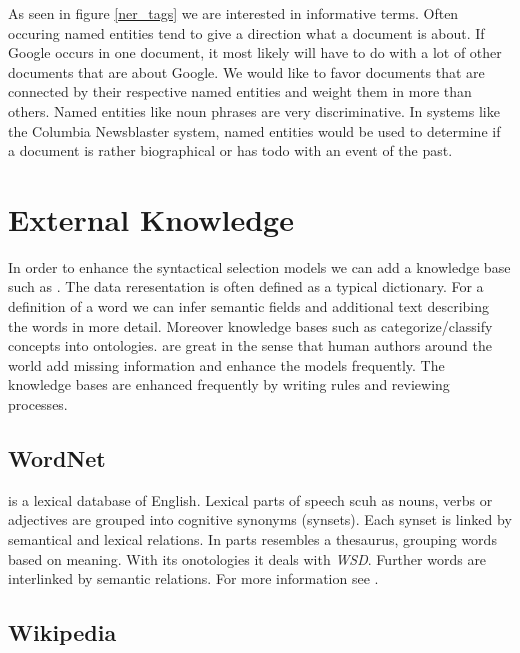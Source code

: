   As seen in figure \ref{ner_tags} we are interested in informative terms. Often occuring named entities tend to give a direction what a document is about. If Google occurs in one document, it most likely will have to do with a lot of other documents that are about Google. We would like to favor documents that are connected by their respective named entities and weight them in more than others. Named entities like noun phrases are very discriminative. In systems like the Columbia Newsblaster system, named entities would be used to determine if a document is rather biographical or has todo with an event of the past. \cite[Columbia stuff]{Nothing}

\section{External Knowledge}
\label{sec:semantic_selection}

  In order to enhance the syntactical selection models we can add a knowledge base such as \wordwiki{}. The data reresentation is often defined as a typical dictionary. For a definition of a word we can infer semantic fields and additional text describing the words in more detail. Moreover knowledge bases such as \wiki{} categorize/classify concepts into ontologies. \wordwiki{} are great in the sense that human authors around the world add missing information and enhance the models frequently. The knowledge bases are enhanced frequently by writing rules and reviewing processes.

  \subsection{WordNet}
  \label{sec:wordnet}
  \wordnet{} is a lexical database of English. Lexical parts of speech scuh as nouns, verbs or adjectives are grouped into cognitive synonyms (synsets). Each synset is linked by semantical and lexical relations. In parts \wordnet{} resembles a thesaurus, grouping words based on meaning. With its onotologies it deals with \emph{WSD}. Further words are interlinked by semantic relations. For more information see \cite{Wordnet1995, Wordnet1998}.


  \subsection{Wikipedia}
  \label{sec:wikpedia}
  

